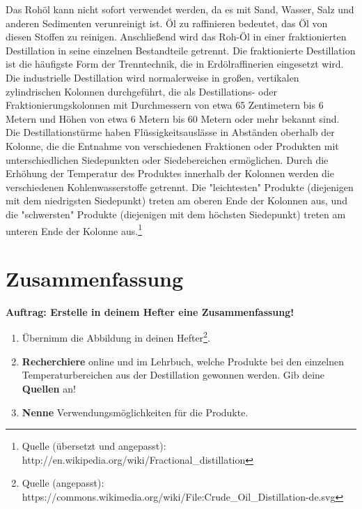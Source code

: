 \documentclass{scrartcl}  %
\begin{document}
\begin{tcolorbox}
				
				\noindent Das Rohöl kann nicht sofort verwendet werden, da es mit Sand, Wasser, Salz und anderen Sedimenten verunreinigt ist. Öl zu raffinieren bedeutet, das Öl von diesen Stoffen zu reinigen. \newline
				Anschließend wird das Roh-Öl in einer fraktionierten Destillation in seine einzelnen Bestandteile getrennt.
				Die fraktionierte Destillation ist die häufigste Form der Trenntechnik, die in Erdölraffinerien eingesetzt wird. 
				Die industrielle Destillation wird normalerweise in großen, vertikalen zylindrischen Kolonnen durchgeführt, die als Destillations- oder Fraktionierungskolonnen mit Durchmessern von etwa 65 Zentimetern bis 6 Metern und Höhen von etwa 6 Metern bis 60 Metern oder mehr bekannt sind. Die Destillationstürme haben Flüssigkeitsauslässe in Abständen oberhalb der Kolonne, die die Entnahme von verschiedenen Fraktionen oder Produkten mit unterschiedlichen Siedepunkten oder Siedebereichen ermöglichen. Durch die Erhöhung der Temperatur des Produktes innerhalb der Kolonnen werden die verschiedenen Kohlenwasserstoffe getrennt. Die "leichtesten" Produkte (diejenigen mit dem niedrigsten Siedepunkt) treten am oberen Ende der Kolonnen aus, und die "schwersten" Produkte (diejenigen mit dem höchsten Siedepunkt) treten am unteren Ende der Kolonne aus.\footnote{Quelle (übersetzt und  angepasst): http://en.wikipedia.org/wiki/Fractional\_distillation}
			\end{tcolorbox}
\newpage
		\section{Zusammenfassung}
		
			\noindent \textbf{Auftrag: Erstelle in deinem Hefter eine Zusammenfassung!}
			\begin{enumerate}
				\item Übernimm die Abbildung in deinen Hefter\footnote{Quelle (angepasst): https://commons.wikimedia.org/wiki/File:Crude\_Oil\_Distillation-de.svg}.
				\item \textbf{Recherchiere} online und im Lehrbuch, welche Produkte bei den einzelnen Temperaturbereichen aus der Destillation gewonnen werden. Gib deine \textbf{Quellen} an!
				\item \textbf{Nenne} Verwendungsmöglichkeiten für die Produkte.
			\end{enumerate}
		
\end{document}
